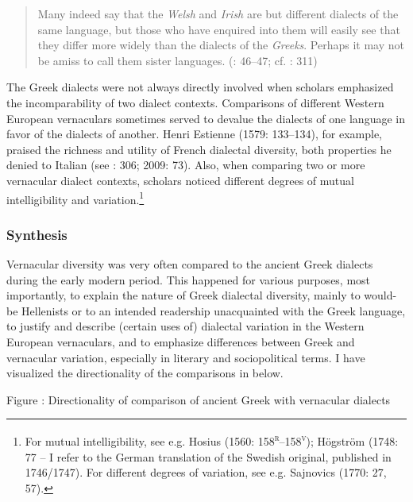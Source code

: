 \begin{quote}
Many indeed say that the \textit{Welsh} and \textit{Irish} are but different dialects of the same language, but those who have enquired into them will easily see that they differ more widely than the dialects of the \textit{Greeks}. Perhaps it may not be amiss to call them sister languages. (\citealt{Malcolm1738}: 46–47; cf. \citealt{MacNicol1779}: 311)
\end{quote}

The Greek dialects were not always directly involved when scholars emphasized the incomparability of two dialect contexts. Comparisons of different Western European vernaculars sometimes served to devalue the dialects of one language in favor of the dialects of another. Henri Estienne (1579: 133–134), for example, praised the richness and utility of French dialectal diversity, both properties he denied to Italian (see \citealt{Swiggers1997}: 306; 2009: 73). Also, when comparing two or more vernacular dialect contexts, scholars noticed different degrees of mutual intelligibility and variation.\footnote{For mutual intelligibility, see e.g. Hosius (1560: 158\textsc{\textsuperscript{r}}\textsc{–158}\textsc{\textsuperscript{v}}); Högström (1748: 77 – I refer to the German translation of the Swedish original, published in 1746/1747). For different degrees of variation, see e.g. Sajnovics (1770: 27, 57).}

\subsubsection{Synthesis}
\hypertarget{Toc19704862}{}
Vernacular diversity was very often compared to the ancient Greek dialects during the early modern period. This happened for various purposes, most importantly,  to explain the nature of Greek dialectal diversity, mainly to would-be Hellenists or to an intended readership unacquainted with the Greek language,  to justify and describe (certain uses of) dialectal variation in the Western European vernaculars, and  to emphasize differences between Greek and vernacular variation, especially in literary and sociopolitical terms. I have visualized the directionality of the comparisons in  below.

\begin{stylecaption}
Figure : Directionality of comparison of ancient Greek with vernacular dialects
\end{stylecaption}

